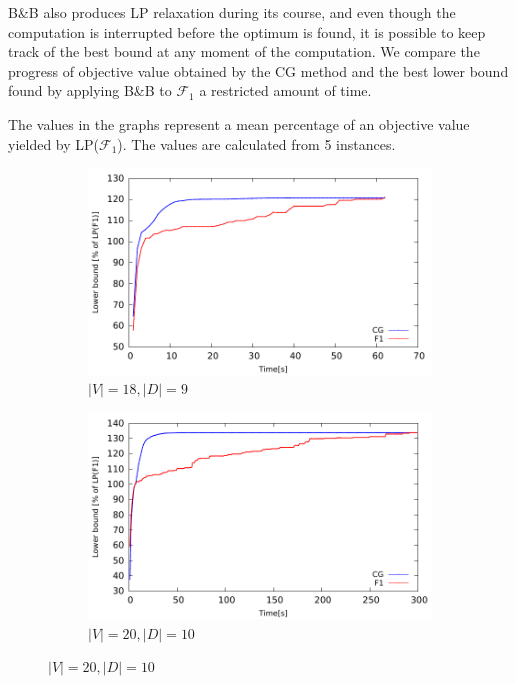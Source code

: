 B\&B also produces LP relaxation during its course, and even though the computation is interrupted before the optimum is found, it is possible to keep track of the best bound at any moment of the computation.
We compare the progress of objective value obtained by the CG method and the best lower bound found by applying B\&B to $\mathcal{F}_1$ a restricted amount of time.
 
The values in the graphs represent a mean percentage of an objective value yielded by LP($\mathcal{F}_1$).
The values are calculated from 5 instances.
 
\begin{figure}[!htb]
    \centering
    \begin{subfigure}[b]{0.49\textwidth}
        \includegraphics[width=\textwidth]{lower-bound-18-9}
        \caption{$|V|=18, |D|=9$}
        \label{fig:cggr18-9}
    \end{subfigure}
    \hfill %
    \begin{subfigure}[b]{0.49\textwidth}
        \includegraphics[width=\textwidth]{lower-bound-20-10}
        \caption{$|V|=20, |D|=10$}
        \label{fig:cggr20-10}
    \end{subfigure}
  

\end{figure}
